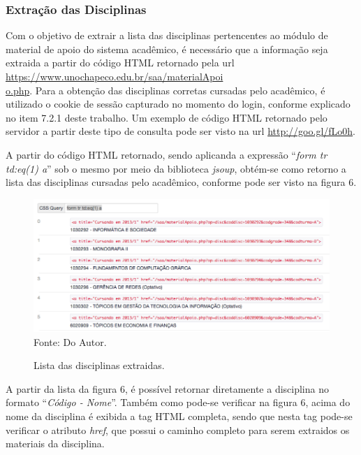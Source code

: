 \subsubsection{Extração das Disciplinas}
Com o objetivo de extrair a lista das disciplinas pertencentes ao módulo de material de apoio do sistema acadêmico, é necessário que a informação seja extraida a partir do código HTML retornado pela url \url{https://www.unochapeco.edu.br/saa/materialApoi} \\ \url{o.php}. Para a obtenção das disciplinas corretas cursadas pelo acadêmico, é utilizado o cookie de sessão capturado no momento do login, conforme explicado no item 7.2.1 deste trabalho. Um exemplo de código HTML retornado pelo servidor a partir deste tipo de consulta pode ser visto na url \url{http://goo.gl/fLo0h}.

A partir do código HTML retornado, sendo aplicanda a expressão ``\emph{form tr td:eq(1) a}'' sob o mesmo por meio da biblioteca \emph{jsoup}, obtém-se como retorno a lista das disciplinas cursadas pelo acadêmico, conforme pode ser visto na figura 6.

\begin{figure}[!htb]
     \centering
     \caption[Extração de Informações - Lista de Disciplinas do Material de Apoio]{Lista das disciplinas extraidas.}
     \includegraphics[scale=0.5]{imagens/listadisciplinasmaterialapoio.png}
     \\ Fonte: Do Autor.
\end{figure}

A partir da lista da figura 6, é possível retornar diretamente a disciplina no formato ``\emph{Código - Nome}''. Também como pode-se verificar na figura 6, acima do nome da disciplina é exibida a tag HTML completa, sendo que nesta tag pode-se verificar o atributo \emph{href}, que possui o caminho completo para serem extraidos os materiais da disciplina.

